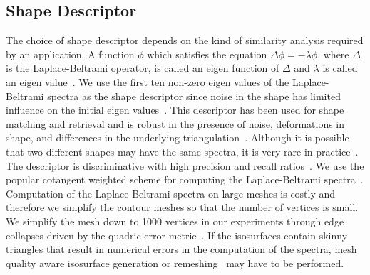 \documentclass[review,journal]{vgtc}         %
\begin{document}
%
\subsection{Shape Descriptor}
The choice of shape descriptor depends on the kind of similarity
analysis required by an application. {\color{blue}A function $\phi$ which satisfies the equation 
$\Delta \phi = -\lambda \phi$, where $\Delta$ is the Laplace-Beltrami operator, is called an eigen
function of $\Delta$ and $\lambda$ is called an eigen value~\cite{LB}.
We use the first ten non-zero eigen values of the Laplace-Beltrami spectra as the shape descriptor
since noise in the shape has limited influence on the initial eigen values~\cite{lian2013}.
This descriptor has been used for 
shape matching and retrieval and is robust in the 
presence of noise, deformations in shape, and differences in the underlying 
triangulation~\cite{reuter2006laplace,niethammer2007global,reuter2009laplace}.
}
Although it is possible that two different shapes may have the same spectra,
it is very rare in practice~\cite{reuter2006laplace}. The descriptor is 
discriminative with high precision and recall ratios~\cite{lian2013}. 
We use the popular cotangent weighted scheme for computing the 
Laplace-Beltrami spectra~\cite{PinkallP93}. Computation of the Laplace-Beltrami spectra 
on large meshes is costly and therefore we simplify the contour meshes 
so that the number of vertices is small. {\color{blue}We simplify the mesh down to 1000 
vertices in our experiments through edge collapses driven by the quadric error metric~\cite{Hoppe99}. 
If the isosurfaces contain skinny triangles that result in numerical errors in the computation of the spectra,
mesh quality aware isosurface generation or remeshing~\cite{Schreiner06EG,Schreiner06Vis} may have 
to be performed.}
\end{document}
